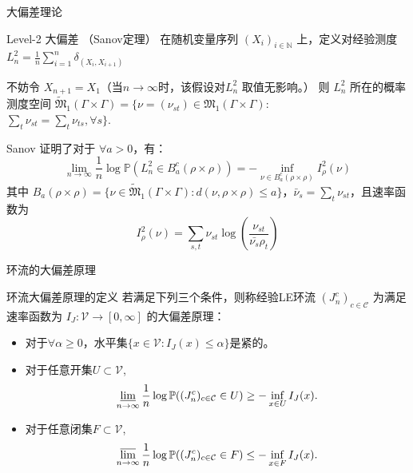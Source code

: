 \documentclass{beamer}
\begin{document}
\begin{frame}{大偏差理论}
	\begin{block}{Level-2 大偏差 （Sanov定理）}
		在随机变量序列 $(\mathit{X}_i)_{i\in \mathbb{N}}$ 上，定义对经验测度
		$\mathit{L}_n^2 = \frac{1}{n} \sum_{i=1}^n \delta_{(\mathit{X}_i, \mathit{X}_{i+1})}$

		不妨令 $\mathit{X}_{n+1} = \mathit{X}_1$（当$n\rightarrow \infty$时，该假设对$\mathit{L}_n^2$ 取值无影响。）
		则 $\mathit{L}_n^2$ 所在的概率测度空间
		$\widetilde{\mathfrak{M}}_1(\Gamma \times \Gamma) = \{\nu=(\nu_{st}) \in \mathfrak{M}_1(\Gamma \times \Gamma):$ \\$ \sum_{t} \nu_{st} = \sum_{t} \nu_{ts}, \forall s\}.$

			Sanov 证明了对于 $\forall a > 0$，有：
			$$
				\lim_{n \rightarrow \infty} \frac{1}{n} \log \mathbb{P}(\mathit{L}_n^2 \in B_a^c(\rho \times \rho))
				= - \inf_{\nu \in B_a^c(\rho \times \rho)} \mathit{I}_{\rho}^2(\nu)
			$$
			其中 $B_a(\rho \times \rho) = \{\nu \in \widetilde{\mathfrak{M}}_1(\Gamma \times \Gamma): d(\nu, \rho \times \rho) \le a\}$，$\bar{\nu}_s = \sum_t \nu_{st}$，且速率函数为
		$$
			\mathit{I}_{\rho}^2(\nu) = \sum_{s,t} \nu_{st} \log\left(\frac{\nu_{st}}{\bar{\nu_s}\rho_t}\right)
		$$
	\end{block}
\end{frame}

\begin{frame}{环流的大偏差原理}
	\begin{block}{环流大偏差原理的定义}
		若满足下列三个条件，则称经验LE环流 $(J_n^c)_{c \in \mathcal{C}}$ 为满足速率函数为 $I_J:\mathcal{V}\rightarrow [0,\infty]$ 的大偏差原理：
		\begin{itemize}
			\item 对于$\forall \alpha \geqslant 0$，水平集$\{x \in \mathcal{V}: I_{J}(x) \leqslant \alpha\}$是紧的。
			\item 对于任意开集$U \subset \mathcal{V}$,
			      \begin{equation}\label{def1}
				      \varliminf_{n\to\infty}\frac{1}{n}\log\mathbb{P}((J^c_n)_{c\in\mathcal{C}}\in U)\ge-\inf_{x\in U}I_J(x).
			      \end{equation}
			\item 对于任意闭集$F \subset \mathcal{V}$,
			      \begin{equation}\label{def2}
				      \varlimsup_{n\to \infty}\frac{1}{n}\log\mathbb{P}((J^c_n)_{c\in\mathcal{C}}\in F)\le -\inf_{x\in F}I_J(x).
			      \end{equation}
		\end{itemize}
	\end{block}
\end{frame}
\end{document}
